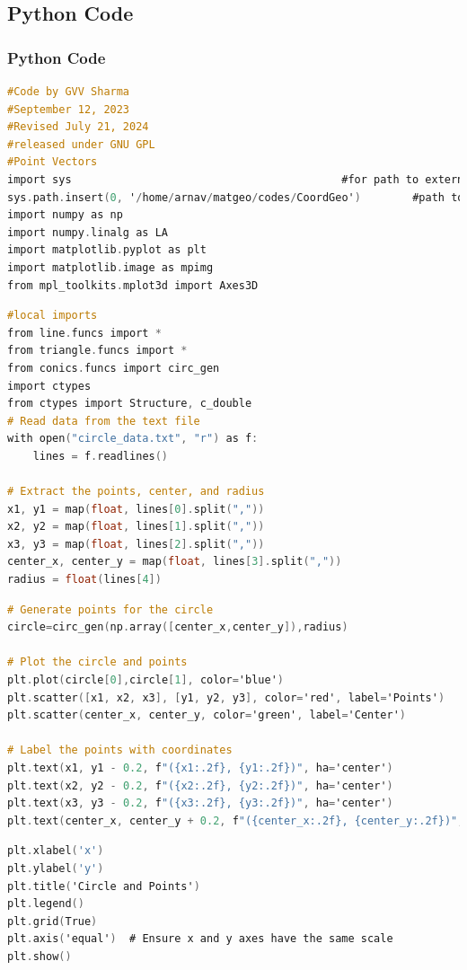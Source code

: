 \documentclass{beamer}
\theoremstyle{remark}
\numberwithin{equation}{section}
\begin{document}
\subsection{Python Code}
\begin{frame}[fragile]
\frametitle{Python Code}
\begin{lstlisting}[language=C]
#Code by GVV Sharma
#September 12, 2023
#Revised July 21, 2024
#released under GNU GPL
#Point Vectors
import sys                                          #for path to external scripts
sys.path.insert(0, '/home/arnav/matgeo/codes/CoordGeo')        #path to my scripts
import numpy as np
import numpy.linalg as LA
import matplotlib.pyplot as plt
import matplotlib.image as mpimg
from mpl_toolkits.mplot3d import Axes3D
\end{lstlisting}
\end{frame}
\begin{frame}[fragile]
\begin{lstlisting}[language=C]
#local imports
from line.funcs import *
from triangle.funcs import *
from conics.funcs import circ_gen
import ctypes
from ctypes import Structure, c_double
# Read data from the text file
with open("circle_data.txt", "r") as f:
    lines = f.readlines()

# Extract the points, center, and radius
x1, y1 = map(float, lines[0].split(","))
x2, y2 = map(float, lines[1].split(","))
x3, y3 = map(float, lines[2].split(","))
center_x, center_y = map(float, lines[3].split(","))
radius = float(lines[4])
\end{lstlisting}
\end{frame}
\begin{frame}[fragile]
\begin{lstlisting}[language=C]
# Generate points for the circle
circle=circ_gen(np.array([center_x,center_y]),radius)

# Plot the circle and points
plt.plot(circle[0],circle[1], color='blue')
plt.scatter([x1, x2, x3], [y1, y2, y3], color='red', label='Points')
plt.scatter(center_x, center_y, color='green', label='Center')

# Label the points with coordinates
plt.text(x1, y1 - 0.2, f"({x1:.2f}, {y1:.2f})", ha='center')
plt.text(x2, y2 - 0.2, f"({x2:.2f}, {y2:.2f})", ha='center')
plt.text(x3, y3 - 0.2, f"({x3:.2f}, {y3:.2f})", ha='center')
plt.text(center_x, center_y + 0.2, f"({center_x:.2f}, {center_y:.2f})", ha='center')
\end{lstlisting}
\end{frame}
\begin{frame}[fragile]
\begin{lstlisting}[language=C]
plt.xlabel('x')
plt.ylabel('y')
plt.title('Circle and Points')
plt.legend()
plt.grid(True)
plt.axis('equal')  # Ensure x and y axes have the same scale
plt.show()
\end{lstlisting}
\end{frame}
\end{document}
